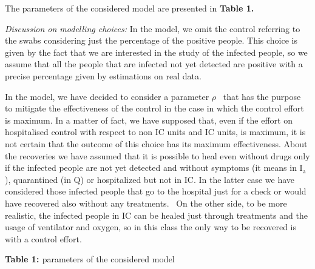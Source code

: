 \documentclass[a4paper]{article}
\providecommand\textsubscript[1]{\ensuremath{{}_{\text{#1}}}}
\begin{document}
\bigskip


\bigskip


\bigskip


\bigskip


\bigskip


\bigskip

The parameters of the considered model are presented in \textbf{Table 1.}

\textit{Discussion on modelling choices: }In the model, we omit the control referring to the swabs considering just the
percentage of the positive people. This choice is given by the fact that we are interested in the study of the infected
people, so we assume that all the people that are infected not yet detected are positive with a precise percentage
given by estimations on real data. 

In the model, we have decided to consider a parameter  $\rho $ \ that has the purpose to mitigate the effectiveness of
the control in the case in which the control effort is maximum. In a matter of fact, we have supposed that, even if the
effort on hospitalised control with respect to non IC units and IC units, is maximum, it is not certain that the
outcome of this choice has its maximum effectiveness. About the recoveries we have assumed that it is possible to heal
even without drugs only if the infected people are not yet detected and without symptoms (it means in
I\textsubscript{a}), quarantined (in Q) or hospitalized but not in IC. In the latter case we have considered those
infected people that go to the hospital just for a check or would have recovered also without any treatments. \ On the
other side, to be more realistic, the infected people in IC can be healed just through treatments and the usage of
ventilator and oxygen, so in this class the only way to be recovered is with a control effort. 


\bigskip


\bigskip

\textbf{\textcolor[rgb]{0.07450981,0.078431375,0.07450981}{Table 1:
}}\textcolor[rgb]{0.07450981,0.078431375,0.07450981}{parameters of the considered model}
\end{document}
